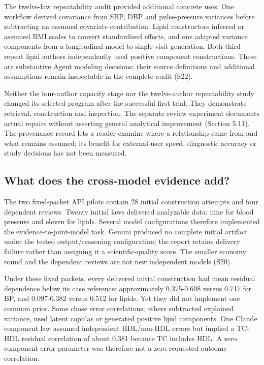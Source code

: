 \documentclass[11pt,letterpaper]{article}
\begin{document}
The twelve-law repeatability audit provided additional concrete uses. One workflow derived covariance from SBP, DBP and pulse-pressure variances before subtracting an assumed covariate contribution. Lipid constructors inferred or assumed BMI scales to convert standardized effects, and one adapted variance components from a longitudinal model to single-visit generation. Both third-repeat lipid authors independently used positive component constructions. These are substantive Agent modeling decisions; their source definitions and additional assumptions remain inspectable in the complete audit (S22).


Neither the four-author capacity stage nor the twelve-author repeatability study changed its selected program after the successful first trial. They demonstrate retrieval, construction and inspection. The separate review experiment documents actual repairs without asserting general analytical improvement (Section 5.11). The provenance record lets a reader examine where a relationship came from and what remains assumed; its benefit for external-user speed, diagnostic accuracy or study decisions has not been measured.


\subsection{What does the cross-model evidence add?}

The two fixed-packet API pilots contain 28 initial construction attempts and four dependent reviews. Twenty initial laws delivered analyzable data: nine for blood pressure and eleven for lipids. Several model configurations therefore implemented the evidence-to-joint-model task. Gemini produced no complete initial artifact under the tested output/\allowbreak{}reasoning configuration; the report retains delivery failure rather than assigning it a scientific-quality score. The smaller economy round and the dependent reviews are not new independent models (S20).


Under these fixed packets, every delivered initial construction had mean residual dependence below its case reference: approximately 0.375-0.608 versus 0.717 for BP, and 0.097-0.382 versus 0.512 for lipids. Yet they did not implement one common prior. Some chose error correlations; others subtracted explained variance, used latent copulas or generated positive lipid components. One Claude component law assumed independent HDL/\allowbreak{}non-HDL errors but implied a TC-HDL residual correlation of about 0.381 because TC includes HDL. A zero component-error parameter was therefore not a zero requested outcome correlation.
\end{document}
